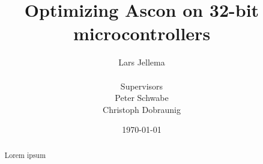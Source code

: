 \documentclass{article}
\title{Optimizing Ascon on 32-bit microcontrollers}
\author{Lars Jellema \\\\
\small Supervisors \\ Peter Schwabe \\ Christoph Dobraunig}
\date{\today}
\begin{document}
\maketitle

\begin{abstract}
Lorem ipsum\cite{nix}
\end{abstract}

\clearpage









\end{document}
